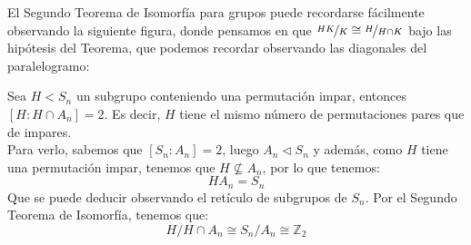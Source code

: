 \noindent
El Segundo Teorema de Isomorfía para grupos puede recordarse fácilmente observando la siguiente figura, donde pensamos en que $\nicefrac{HK}{K}\cong \nicefrac{H}{H\cap K}$ bajo las hipótesis del Teorema, que podemos recordar observando las diagonales del paralelogramo:
\begin{figure}[H]
    \centering
\end{figure}

\begin{ejemplo} %
    Sea $H<S_n$ un subgrupo conteniendo una permutación impar, entonces $[H:H\cap A_n]=2$. Es decir, $H$ tiene el mismo número de permutaciones pares que de impares.\\

    \noindent
    Para verlo, sabemos que $[S_n : A_n] = 2$, luego $A_n\lhd S_n$ y además, como $H$ tiene una permutación impar, tenemos que $H\nsubseteq A_n$, por lo que tenemos:
    \begin{equation*}
        HA_n = S_n
    \end{equation*}
    Que se puede deducir observando el retículo de subgrupos de $S_n$. Por el Segundo Teorema de Isomorfía, tenemos que:
    \begin{equation*}
        H/H\cap A_n \cong S_n/A_n \cong \mathbb{Z}_2
    \end{equation*}
\end{ejemplo}


